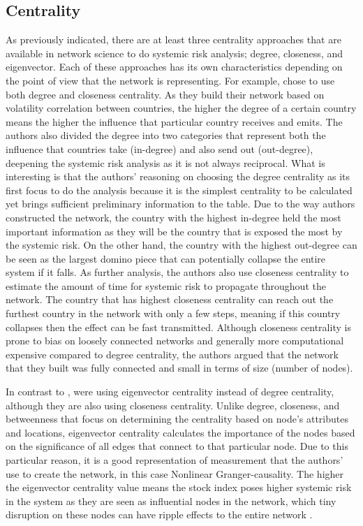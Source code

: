 \documentclass[a4paper,11pt]{article}
\begin{document}
\subsection{Centrality}
As previously indicated, there are at least three centrality approaches that are available in network science to do systemic risk analysis; degree, closeness, and eigenvector. Each of these approaches has its own characteristics depending on the point of view that the network is representing.
For example, \cite{Lai_Hu_2021} chose to use both degree and closeness centrality. As they build their network based on volatility correlation between countries, the higher the degree of a certain country means the higher the influence that particular country receives and emits. The authors also divided the degree into two categories that represent both the influence that countries take (in-degree) and also send out (out-degree), deepening the systemic risk analysis as it is not always reciprocal. What is interesting is that the authors’ reasoning on choosing the degree centrality as its first focus to do the analysis because it is the simplest centrality to be calculated yet brings sufficient preliminary information to the table. Due to the way authors constructed the network, the country with the highest in-degree held the most important information as they will be the country that is exposed the most by the systemic risk. On the other hand, the country with the highest out-degree can be seen as the largest domino piece that can potentially collapse the entire system if it falls. As further analysis, the authors also use closeness centrality to estimate the amount of time for systemic risk to propagate throughout the network. The country that has highest closeness centrality can reach out the furthest country in the network with only a few steps, meaning if this country collapses then the effect can be fast transmitted. Although closeness centrality is prone to bias on loosely connected networks and generally more computational expensive compared to degree centrality, the authors argued that the network that they built was fully connected and small in terms of size (number of nodes). 

In contrast to \cite{Lai_Hu_2021}, \cite{Zhang_Yin_Sha_2023} were using eigenvector centrality instead of degree centrality, although they are also using closeness centrality. Unlike degree, closeness, and betweenness that focus on determining the centrality based on node’s attributes and locations, eigenvector centrality calculates the importance of the nodes based on the significance of all edges that connect to that particular node. Due to this particular reason, it is a good representation of measurement that the authors’ use to create the network, in this case Nonlinear Granger-causality. The higher the eigenvector centrality value means the stock index poses higher systemic risk in the system as they are seen as influential nodes in the network, which tiny disruption on these nodes can have ripple effects to the entire network \cite{Zhang_Yin_Sha_2023}. 
\end{document}
